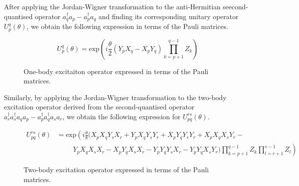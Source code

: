 After applying the Jordan-Wigner transformation to the anti-Hermitian seecond-quantised operator $a_q^\dagger a_p - a_p^\dagger a_q$ and finding its corresponding unitary operator $U^q_p(\theta)$, we obtain the following expression in terms of the Pauli matrices.


\begin{figure}[H]
    \centering
    \begin{equation*}
        U^q_p (\theta) =
        \text{exp} \left( i
        \frac{\theta}{2} (Y_p X_q - X_p Y_q) \prod_{k=p+1}^{q-1} Z_k \right)
    \end{equation*}
    \caption{One-body excitaiton operator expressed in terms of the Pauli matrices.}
    \label{one-body-excitation-operator}
\end{figure}

Similarly, by applying the Jordan-Wigner transformation to the two-body excitation operator derived from the second-quantised operator $a_r^\dagger a_s^\dagger a_q a_p - a_p^\dagger a_q^\dagger a_s a_r$, we obtain the following expression for $U^{rs}_{pq} (\theta)$.


\begin{figure}[H]
    \centering
    \begin{align*}
        U^{rs}_{pq} (\theta) &= \text{exp} \left( i \frac{\theta}{8} (
        X_p X_q Y_s X_r +
        Y_p X_q Y_s Y_r +
        X_p Y_q Y_s Y_r +
        X_p X_q X_s Y_r - \right. \\
        &\left. \hspace{1cm} 
        Y_p X_q X_s X_r -
        X_p Y_q X_s X_r -
        Y_p Y_q Y_s X_r -
        Y_p Y_q X_s Y_r )
        \prod_{k=p+1}^{q-1} Z_k
        \prod_{l=r+1}^{s-1} Z_l
        \right)
    \end{align*}
    \caption{Two-body excitation operator expressed in terms of the Pauli matrices.}
\end{figure}

